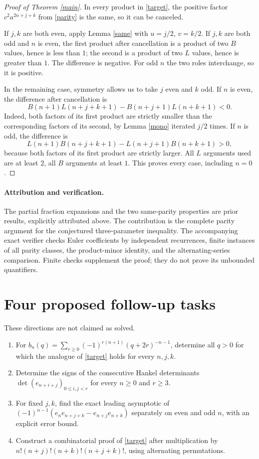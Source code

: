 \documentclass[11pt]{article}
\begin{document}
\begin{proof}[Proof of Theorem \ref{main}]
In every product in \eqref{target}, the positive factor $c^2a^{2n+j+k}$
from \eqref{parity} is the same, so it can be canceled.

If $j,k$ are both even, apply Lemma \ref{same} with $u=j/2$, $v=k/2$.
If $j,k$ are both odd and $n$ is even, the first product after cancellation
is a product of two $B$ values, hence is less than $1$; the second is a
product of two $L$ values, hence is greater than $1$. The difference is
negative. For odd $n$ the two roles interchange, so it is positive.

In the remaining case, symmetry allows us to take $j$ even and $k$ odd.
If $n$ is even, the difference after cancellation is
\[
 B(n+1)L(n+j+k+1)-B(n+j+1)L(n+k+1)<0.
\]
Indeed, both factors of its first product are strictly smaller than
the corresponding factors of its second, by Lemma \ref{mono} iterated
$j/2$ times. If $n$ is odd, the difference is
\[
 L(n+1)B(n+j+k+1)-L(n+j+1)B(n+k+1)>0,
\]
because both factors of its first product are strictly larger. All $L$
arguments used are at least $2$, all $B$ arguments at least $1$.
This proves every case, including $n=0$.
\end{proof}

\paragraph{Attribution and verification.}
The partial fraction expansions and the two same-parity properties are
prior results, explicitly attributed above. The contribution is the
complete parity argument for the conjectured three-parameter inequality.
The accompanying exact verifier checks Euler coefficients by independent
recurrences, finite instances of all parity classes, the product-minor
identity, and the alternating-series comparison. Finite checks supplement
the proof; they do not prove its unbounded quantifiers.

\section*{Four proposed follow-up tasks}
These directions are not claimed as solved.
\begin{enumerate}[label=Task \arabic*:,start=2,leftmargin=4.5em]
\item For $b_n(q)=\sum_{r\ge0}(-1)^{r(n+1)}(q+2r)^{-n-1}$, determine
all $q>0$ for which the analogue of \eqref{target} holds for every $n,j,k$.
\item Determine the signs of the consecutive Hankel determinants
$\det(e_{n+i+j})_{0\le i,j<r}$ for every $n\ge0$ and $r\ge3$.
\item For fixed $j,k$, find the exact leading asymptotic of
$(-1)^{n-1}(e_ne_{n+j+k}-e_{n+j}e_{n+k})$ separately on even and odd $n$,
with an explicit error bound.
\item Construct a combinatorial proof of \eqref{target} after multiplication
by $n!(n+j)!(n+k)!(n+j+k)!$, using alternating permutations.
\end{enumerate}
\end{document}
